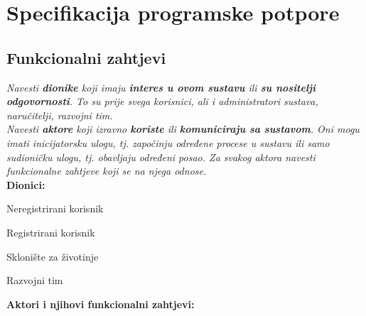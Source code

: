 \chapter{Specifikacija programske potpore}
		
	\section{Funkcionalni zahtjevi}
			
			\textit{Navesti \textbf{dionike} koji imaju \textbf{interes u ovom sustavu} ili  \textbf{su nositelji odgovornosti}. To su prije svega korisnici, ali i administratori sustava, naručitelji, razvojni tim.}\\
				
			\textit{Navesti \textbf{aktore} koji izravno \textbf{koriste} ili \textbf{komuniciraju sa sustavom}. Oni mogu imati inicijatorsku ulogu, tj. započinju određene procese u sustavu ili samo sudioničku ulogu, tj. obavljaju određeni posao. Za svakog aktora navesti funkcionalne zahtjeve koji se na njega odnose.}\\
			
			
			\noindent \textbf{Dionici:}
			
			\begin{packed_enum}
				
				\item Neregistrirani korisnik
				\item Registrirani korisnik			
				\item Sklonište za životinje
				\item Razvojni tim
				
			\end{packed_enum}
			
			\noindent \textbf{Aktori i njihovi funkcionalni zahtjevi:}
			

